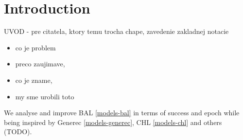 







\section*{Introduction}


UVOD - pre citatela, ktory temu trocha chape, zavedenie zakladnej notacie 
\begin{itemize} 
\item   co je problem
\item   preco zaujimave,
\item   co je zname,
\item   my sme urobili toto
\end{itemize} 

We analyse and improve BAL \ref{models-bal} in terms of success and epoch while being inspired by Generec \ref{models-generec}, CHL \ref{models-chl} and others (TODO). 

